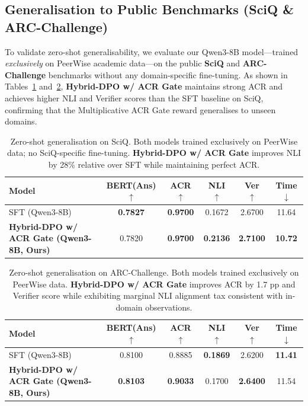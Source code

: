 \subsection{Generalisation to Public Benchmarks (SciQ \& ARC-Challenge)}
\label{sec:sciq_results}

To validate zero-shot generalisability, we evaluate our Qwen3-8B model---trained \emph{exclusively} on PeerWise academic data---on the public \textbf{SciQ} and \textbf{ARC-Challenge} benchmarks without any domain-specific fine-tuning. As shown in Tables~\ref{tab:sciq_results} and~\ref{tab:arc_results}, \textbf{Hybrid-DPO w/ ACR Gate} maintains strong ACR and achieves higher NLI and Verifier scores than the SFT baseline on SciQ, confirming that the Multiplicative ACR Gate reward generalises to unseen domains.

\begin{table}[h]
\centering
\small
\begin{tabular}{l|c|c|c|c|c}
\toprule
Model & BERT(Ans) $\uparrow$ & ACR $\uparrow$ & NLI $\uparrow$ & Ver $\uparrow$ & Time $\downarrow$ \\
\midrule
SFT (Qwen3-8B) & \textbf{0.7827} & \textbf{0.9700} & 0.1672 & 2.6700 & 11.64 \\
\textbf{Hybrid-DPO w/ ACR Gate (Qwen3-8B, Ours)} & 0.7820 & \textbf{0.9700} & \textbf{0.2136} & \textbf{2.7100} & \textbf{10.72} \\
\bottomrule
\end{tabular}
\caption{Zero-shot generalisation on SciQ. Both models trained exclusively on PeerWise data; no SciQ-specific fine-tuning. \textbf{Hybrid-DPO w/ ACR Gate} improves NLI by 28\% relative over SFT while maintaining perfect ACR.}
\label{tab:sciq_results}
\end{table}

\begin{table}[h]
\centering
\small
\begin{tabular}{l|c|c|c|c|c}
\toprule
Model & BERT(Ans) $\uparrow$ & ACR $\uparrow$ & NLI $\uparrow$ & Ver $\uparrow$ & Time $\downarrow$ \\
\midrule
SFT (Qwen3-8B) & 0.8100 & 0.8885 & \textbf{0.1869} & 2.6200 & \textbf{11.41} \\
\textbf{Hybrid-DPO w/ ACR Gate (Qwen3-8B, Ours)} & \textbf{0.8103} & \textbf{0.9033} & 0.1700 & \textbf{2.6400} & 11.54 \\
\bottomrule
\end{tabular}
\caption{Zero-shot generalisation on ARC-Challenge. Both models trained exclusively on PeerWise data. \textbf{Hybrid-DPO w/ ACR Gate} improves ACR by 1.7 pp and Verifier score while exhibiting marginal NLI alignment tax consistent with in-domain observations.}
\label{tab:arc_results}
\end{table}

